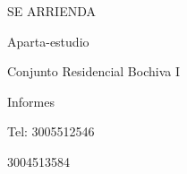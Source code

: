 \documentclass[final]{beamer}
\date{Jul. 31th, 2007}
\begin{document}
  \begin{frame}{}
\centering
  \begin{block}
  \centering
      {\VERYHUGE \begin{center}
      SE ARRIENDA
      \end{center}}\par
      {\large \begin{center}
      Aparta-estudio
      \end{center}}\par
      {\large \begin{center}
      Conjunto Residencial Bochiva I
      \end{center}}\par
      {\Large \begin{center}
      Informes
      \end{center}}\par
      {\large \begin{center}
      Tel: 3005512546
      \end{center}}\par
      {\large \begin{center}
      \hspace*{48pt} 3004513584
      \end{center}}\par  
  \end{block}
  \end{frame}
\end{document}
